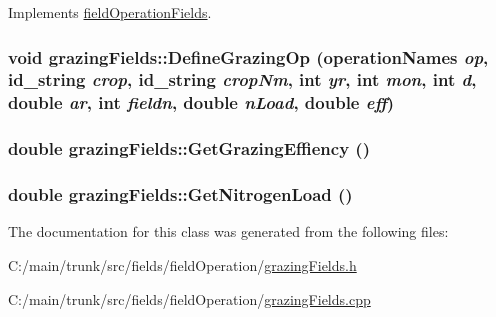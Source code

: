 Implements \hyperlink{classfield_operation_fields_ae5d8585b7e57196ce3801eed29677b3e}{fieldOperationFields}.\hypertarget{classgrazing_fields_ae595ca8c2b07929bef922b6514f88590}{
\subsubsection[{DefineGrazingOp}]{\setlength{\rightskip}{0pt plus 5cm}void grazingFields::DefineGrazingOp ({\bf operationNames} {\em op}, \/  {\bf id\_\-string} {\em crop}, \/  {\bf id\_\-string} {\em cropNm}, \/  int {\em yr}, \/  int {\em mon}, \/  int {\em d}, \/  double {\em ar}, \/  int {\em fieldn}, \/  double {\em nLoad}, \/  double {\em eff})}}
\label{classgrazing_fields_ae595ca8c2b07929bef922b6514f88590}
\hypertarget{classgrazing_fields_a4ec827f111f1021c9d314945f72bdde7}{
\subsubsection[{GetGrazingEffiency}]{\setlength{\rightskip}{0pt plus 5cm}double grazingFields::GetGrazingEffiency ()}}
\label{classgrazing_fields_a4ec827f111f1021c9d314945f72bdde7}
\hypertarget{classgrazing_fields_a00761e6f4df7fbca403c10fba82c57fa}{
\subsubsection[{GetNitrogenLoad}]{\setlength{\rightskip}{0pt plus 5cm}double grazingFields::GetNitrogenLoad ()}}
\label{classgrazing_fields_a00761e6f4df7fbca403c10fba82c57fa}


The documentation for this class was generated from the following files:\begin{DoxyCompactItemize}
\item 
C:/main/trunk/src/fields/fieldOperation/\hyperlink{grazing_fields_8h}{grazingFields.h}\item 
C:/main/trunk/src/fields/fieldOperation/\hyperlink{grazing_fields_8cpp}{grazingFields.cpp}\end{DoxyCompactItemize}
